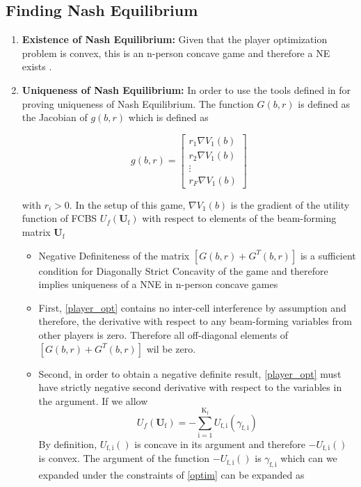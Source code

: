\documentclass[12pt]{article}
\begin{document}
\subsection{Finding Nash Equilibrium}

\begin{enumerate}
\item \textbf{Existence of Nash Equilibrium:} Given that the player optimization problem is convex, this is an n-person concave game and therefore a NE exists \cite[Thm1]{rosen1964existence}. 
\item \textbf{Uniqueness of Nash Equilibrium:} In order to use the tools defined in \cite[Thm4]{rosen1964existence} for proving uniqueness of Nash Equilibrium. The function $G(b,r) $ is defined as the Jacobian of $g(b,r) $ which is defined as 

\begin{equation}
g(b,r)= 
\begin{bmatrix}
r_1 \nabla V_{1}(b)
\\
r_2 \nabla V_{1}(b)
\\
\vdots\\
r_F \nabla V_{1}(b)
\end{bmatrix}
\end{equation}

with $r_i>0$.
In the setup of this game, $\nabla V_{1}(b)$
is the gradient of the utility function of FCBS $U_f(\mathbf{U}_{\mathrm{f}}) $ with respect to elements of the  beam-forming matrix 
$\mathbf{U}_{\mathrm{f}}$


\begin{itemize}
\item
Negative Definiteness of the matrix $[G(b,r)+G^{T}(b,r)] $ is a sufficient condition for Diagonally Strict Concavity of the game and therefore implies uniqueness of a NNE in n-person concave games \cite[Thm6]{rosen1964existence}
	 
\item First, \eqref{player_opt} contains no inter-cell interference by assumption and therefore, the derivative with respect to any beam-forming variables from other players is zero. Therefore all off-diagonal elements of $[G(b,r)+G^{T}(b,r)] $ wil be zero.
\item Second, in order to obtain a negative definite result, \eqref{player_opt} must have strictly negative second derivative with respect to the variables in the argument. If we allow
\begin{equation*}
		U_f(\mathbf{U}_\mathrm{f})=
	    - \sum_{\mathrm{i=1}}^{\mathrm{K_f}}
    	U_{\mathrm{f,i}}(\gamma_{\mathrm{f,i}})
\end{equation*}
By definition, $U_{\mathrm{f,i}}()$ is concave in its argument and therefore $- U_{\mathrm{f,i}}()$ is convex.
The argument of the function $- U_{\mathrm{f,i}}()$  is $\gamma_{\mathrm{f,i}}$ which can we expanded under the constraints of  \eqref{optim} can be expanded as 


\end{itemize}
\end{enumerate}
\end{document}
